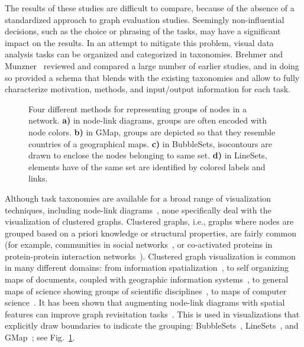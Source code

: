 \documentclass{article}
\begin{document}
The results of these studies are difficult to compare, because of the absence of a standardized approach to graph evaluation studies. Seemingly non-influential decisions, such as the choice or phrasing of the tasks, may have a significant impact on the results. In an attempt to mitigate this problem, visual data analysis tasks can be organized and categorized in taxonomies. Brehmer and Munzner~\cite{IV_Brehmer} reviewed and compared a large number of earlier studies, and in doing so provided a schema that blends with the existing taxonomies and allow to fully characterize motivation, methods, and input/output information for each task. 

\begin{figure}[t]
\centering \hfill
{} \hfill
{} \hfill
{} \hfill
{} \hfill
\caption{Four different methods for representing groups of nodes in a network. \textbf{a)} in node-link diagrams, groups are often encoded with node colors. \textbf{b)} in GMap, groups are depicted so that they resemble countries of a geographical maps. \textbf{c)} in BubbleSets, isocontours are drawn to enclose the nodes belonging to same set. \textbf{d)} in LineSets, elements have of the same set are identified by colored labels and links.}
\label{FIG:prop-p3t}
\end{figure}

Although task taxonomies are available for a broad range of visualization techniques, including node-link diagrams~\cite{IV_BL}, none specifically deal with the visualization of clustered graphs. Clustered graphs, i.e.,   graphs where nodes are grouped based on a priori knowledge or structural properties, are fairly common (for example, communities in social networks~\cite{IV_Mishra}, or co-activated proteins in protein-protein interaction networks~\cite{IV_Barsky}). Clustered graph visualization is common in many different domains: from  information spatialization~\cite{sf-sm-03,fabrikant06}, to self organizing maps of documents, coupled with geographic information systems~\cite{Sk02}, to general maps of science showing groups of scientific disciplines~\cite{Boyack05}, to maps of computer science~\cite{mocs}. It has been shown that augmenting node-link diagrams with spatial features can improve graph revisitation tasks~\cite{Ghani2011}.
This is used in 
visualizations that explicitly draw boundaries to indicate the grouping: BubbleSets~\cite{IV_Collins},
LineSets~\cite{IV_Alper}, and GMap~\cite{IV_Gansner}; see Fig.~\ref{FIG:prop-p3t}.
\end{document}
